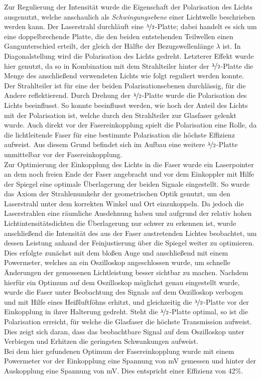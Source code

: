  Zur Regulierung der Intensität wurde die Eigenschaft der Polarisation des Lichts ausgenutzt, welche anschaulich als \textit{Schwingungsebene} einer Lichtwelle beschrieben werden kann. Der Laserstrahl durchläuft eine $\nicefrac{\lambda}{2}$-Platte; dabei handelt es sich um eine doppelbrechende Platte, die den beiden entstehenden Teilwellen einen Gangunterschied erteilt, der gleich der Hälfte der Bezugswellenlänge $\lambda$ ist. In Diagonalstellung wird die Polarisation des Lichts gedreht. Letzterer Effekt wurde hier genutzt, da so in Kombination mit dem Strahlteiler hinter der $\nicefrac{\lambda}{2}$-Platte die Menge des anschließend verwendeten Lichts wie folgt reguliert werden konnte. Der Strahlteiler ist für eine der beiden Polarisationsebenen durchlässig, für die Andere reflektierend. Durch Drehung der $\nicefrac{\lambda}{2}$-Platte wurde die Polarisation des Lichts beeinflusst. So konnte beeinflusst werden, wie hoch der Anteil des Lichts mit der Polarisation ist, welche durch den Strahlteiler zur Glasfaser gelenkt wurde. Auch direkt vor der Fasereinkopplung spielt die Polarisation eine Rolle, da die lichtleitende Faser für eine bestimmte Polarisation die höchste Effizienz aufweist. Aus diesem Grund befindet sich im Aufbau eine weitere $\nicefrac{\lambda}{2}$-Platte unmittelbar vor der Fasereinkopplung. \\

Zur Optimierung der Einkopplung des Lichts in die Faser wurde ein Laserpointer an dem noch freien Ende der Faser angebracht und vor dem Einkoppler mit Hilfe der Spiegel eine optimale Überlagerung der beiden Signale eingestellt. So wurde das Axiom der Strahlenumkehr der geometrischen Optik genutzt, um den Laserstrahl unter dem korrekten Winkel und Ort einzukoppeln. Da jedoch die Laserstrahlen eine räumliche Ausdehnung haben und aufgrund der relativ hohen Lichtintensitätsdichten die Überlagerung nur schwer zu erkennen ist, wurde anschließend die Intensität des aus der Faser austretenden Lichtes beobachtet, um dessen Leistung anhand der Feinjustierung über die Spiegel weiter zu optimieren. Dies erfolgte zunächst mit dem bloßen Auge und anschließend mit einem Powermeter, welches an ein Oszilloskop angeschlossen wurde, um schnelle Änderungen der gemessenen Lichtleistung besser sichtbar zu machen. Nachdem hierfür ein Optimum auf dem Oszilloskop möglichst genau eingestellt wurde, wurde die Faser unter Beobachtung des Signals auf dem Oszilloskop verbogen und mit Hilfe eines Heißluftföhns erhitzt, und gleichzeitig die $\nicefrac{\lambda}{2}$-Platte vor der Einkopplung in ihrer Halterung gedreht. Steht die $\nicefrac{\lambda}{2}$-Platte optimal, so ist die Polarisation erreicht, für welche die Glasfaser die höchste Transmission aufweist. Dies zeigt sich daran, dass das beobachtbare Signal auf dem Oszilloskop unter Verbiegen und Erhitzen die geringsten Schwankungen aufweist. \\
Bei dem hier gefundenen Optimum der Fasereinkopplung wurde mit einem Powermeter vor der Einkopplung eine Spannung von \unit[420]{mV} gemessen und hinter der Auskopplung eine Spannung von \unit[244]{mV}. Dies entspricht einer Effizienz von 42\%. 

